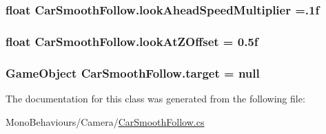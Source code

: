\subsubsection[{\texorpdfstring{look\+Ahead\+Speed\+Multiplier}{lookAheadSpeedMultiplier}}]{\setlength{\rightskip}{0pt plus 5cm}float Car\+Smooth\+Follow.\+look\+Ahead\+Speed\+Multiplier =.\+1f}\hypertarget{class_car_smooth_follow_aad8cfb27b14d3321d2229426beaa572d}{}\label{class_car_smooth_follow_aad8cfb27b14d3321d2229426beaa572d}
\subsubsection[{\texorpdfstring{look\+At\+Z\+Offset}{lookAtZOffset}}]{\setlength{\rightskip}{0pt plus 5cm}float Car\+Smooth\+Follow.\+look\+At\+Z\+Offset = 0.\+5f}\hypertarget{class_car_smooth_follow_ab06bbde8c0f233398b82422accf75545}{}\label{class_car_smooth_follow_ab06bbde8c0f233398b82422accf75545}
\subsubsection[{\texorpdfstring{target}{target}}]{\setlength{\rightskip}{0pt plus 5cm}Game\+Object Car\+Smooth\+Follow.\+target = null}\hypertarget{class_car_smooth_follow_a00e638b32e3abe0f51c6c3b8a8803934}{}\label{class_car_smooth_follow_a00e638b32e3abe0f51c6c3b8a8803934}


The documentation for this class was generated from the following file\+:\begin{DoxyCompactItemize}
\item 
Mono\+Behaviours/\+Camera/\hyperlink{_car_smooth_follow_8cs}{Car\+Smooth\+Follow.\+cs}\end{DoxyCompactItemize}
